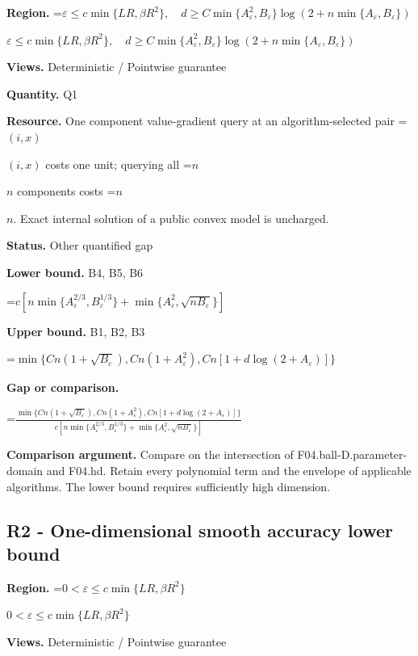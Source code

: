 \documentclass[10pt,a4paper]{article}
\newcommand{\AtlasMath}[1]{\par\begingroup\centering\setbox0=\hbox{$\displaystyle #1$}\ifdim\wd0>1.4\linewidth\typeout{ATLAS WIDE FORMULA: \the\wd0}\fi\ifdim\wd0>\linewidth\resizebox{\linewidth}{!}{\box0}\else\box0\fi\par\endgroup}
\newcommand{\AtlasInlineMath}[1]{\begingroup\setbox0=\hbox{$#1$}\ifdim\wd0>.4\linewidth\endgroup\AtlasMath{#1}\else\endgroup$#1$\fi}
\begin{document}
\textbf{Region.} \AtlasInlineMath{\varepsilon\le c\min\{LR,\beta R^2\},\quad d\ge C\min\{A_\varepsilon^2,B_\varepsilon\}\log(2+n\min\{A_\varepsilon,B_\varepsilon\})}



\textbf{Views.} Deterministic / Pointwise guarantee



\textbf{Quantity.} Q1



\textbf{Resource.} One component value-gradient query at an algorithm-selected pair \AtlasInlineMath{(i,x)} costs one unit; querying all \AtlasInlineMath{n} components costs \AtlasInlineMath{n}. Exact internal solution of a public convex model is uncharged.



\textbf{Status.} Other quantified gap



\textbf{Lower bound.} B4, B5, B6



\AtlasMath{c[n\min\{A_\varepsilon^{2/3},B_\varepsilon^{1/3}\}+\min\{A_\varepsilon^2,\sqrt{nB_\varepsilon}\}]}


\textbf{Upper bound.} B1, B2, B3



\AtlasMath{\min\{Cn(1+\sqrt{B_\varepsilon}),Cn(1+A_\varepsilon^2),Cn[1+d\log(2+A_\varepsilon)]\}}


\textbf{Gap or comparison.}
\AtlasMath{\frac{\min\{Cn(1+\sqrt{B_\varepsilon}),Cn(1+A_\varepsilon^2),Cn[1+d\log(2+A_\varepsilon)]\}}{c[n\min\{A_\varepsilon^{2/3},B_\varepsilon^{1/3}\}+\min\{A_\varepsilon^2,\sqrt{nB_\varepsilon}\}]}}




\textbf{Comparison argument.} Compare on the intersection of F04.ball-D.parameter-domain and F04.hd. Retain every polynomial term and the envelope of applicable algorithms. The lower bound requires sufficiently high dimension.



\subsection{R2 - One-dimensional smooth accuracy lower bound}


\textbf{Region.} \AtlasInlineMath{0<\varepsilon\le c\min\{LR,\beta R^2\}}



\textbf{Views.} Deterministic / Pointwise guarantee
\end{document}
